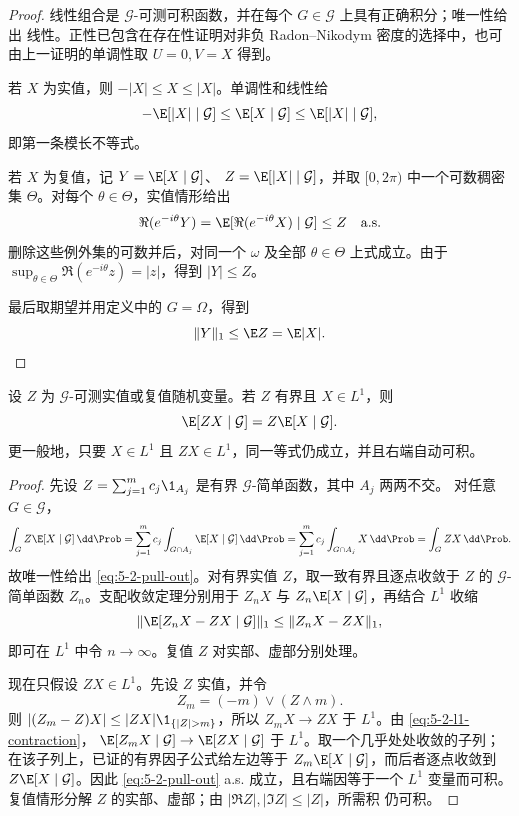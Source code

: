 \begin{proof}
线性组合是 $\mathcal G$-可测可积函数，并在每个 $G\in\mathcal G$ 上具有正确积分；唯一性给出
线性。正性已包含在存在性证明对非负 Radon--Nikodym 密度的选择中，也可由上一证明的单调性取
$U=0,V=X$ 得到。

若 $X$ 为实值，则 $-|X|\leq X\leq|X|$。单调性和线性给
\[
 -\E[|X|\mid\mathcal G]
 \leq\E[X\mid\mathcal G]
 \leq\E[|X|\mid\mathcal G],
\]
即第一条模长不等式。

若 $X$ 为复值，记 $Y=\E[X\mid\mathcal G]$、
$Z=\E[|X|\mid\mathcal G]$，并取 $[0,2\pi)$ 中一个可数稠密集 $\Theta$。对每个
$\theta\in\Theta$，实值情形给出
\[
 \Re(e^{-i\theta}Y)
 =\E[\Re(e^{-i\theta}X)\mid\mathcal G]
 \leq Z\quad\text{a.s.}
\]
删除这些例外集的可数并后，对同一个 $\omega$ 及全部 $\theta\in\Theta$ 上式成立。由于
$\sup_{\theta\in\Theta}\Re(e^{-i\theta}z)=|z|$，得到 $|Y|\leq Z$。

最后取期望并用定义中的 $G=\Omega$，得到
\[
 \|Y\|_1\leq\E Z=\E|X|.
\]
\end{proof}

\begin{proposition}[取出已知因子]\label{proposition:5-2-1-3}
设 $Z$ 为 $\mathcal G$-可测实值或复值随机变量。若 $Z$ 有界且 $X\in L^1$，则
\begin{equation}\label{eq:5-2-pull-out}
 \E[ZX\mid\mathcal G]=Z\E[X\mid\mathcal G].
\end{equation}
更一般地，只要 $X\in L^1$ 且 $ZX\in L^1$，同一等式仍成立，并且右端自动可积。
\end{proposition}

\begin{proof}
先设 $Z=\sum_{j=1}^mc_j\1_{A_j}$ 是有界 $\mathcal G$-简单函数，其中 $A_j$ 两两不交。
对任意 $G\in\mathcal G$，
\[
 \int_G Z\E[X\mid\mathcal G]\,\dd\Prob
 =\sum_{j=1}^mc_j\int_{G\cap A_j}\E[X\mid\mathcal G]\,\dd\Prob
 =\sum_{j=1}^mc_j\int_{G\cap A_j}X\,\dd\Prob
 =\int_GZX\,\dd\Prob.
\]
故唯一性给出 \eqref{eq:5-2-pull-out}。对有界实值 $Z$，取一致有界且逐点收敛于 $Z$ 的
$\mathcal G$-简单函数 $Z_n$。支配收敛定理分别用于 $Z_nX$ 与
$Z_n\E[X\mid\mathcal G]$，再结合 $L^1$ 收缩
\[
 \|\E[Z_nX-ZX\mid\mathcal G]\|_1\leq\|Z_nX-ZX\|_1,
\]
即可在 $L^1$ 中令 $n\to\infty$。复值 $Z$ 对实部、虚部分别处理。

现在只假设 $ZX\in L^1$。先设 $Z$ 实值，并令
\[
 Z_m=(-m)\vee(Z\wedge m).
\]
则 $|(Z_m-Z)X|\leq|ZX|\1_{\{|Z|>m\}}$，所以 $Z_mX\to ZX$ 于 $L^1$。由
\eqref{eq:5-2-l1-contraction}，
$\E[Z_mX\mid\mathcal G]\to\E[ZX\mid\mathcal G]$ 于 $L^1$。取一个几乎处处收敛的子列；
在该子列上，已证的有界因子公式给左边等于
$Z_m\E[X\mid\mathcal G]$，而后者逐点收敛到
$Z\E[X\mid\mathcal G]$。因此 \eqref{eq:5-2-pull-out} a.s. 成立，且右端因等于一个
$L^1$ 变量而可积。复值情形分解 $Z$ 的实部、虚部；由 $|\Re Z|,|\Im Z|\leq|Z|$，所需积
仍可积。
\end{proof}

